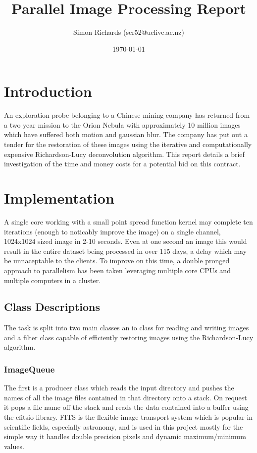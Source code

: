 \documentclass{article}
\title{Parallel Image Processing Report}
\date{\today}
\author{Simon Richards (scr52@uclive.ac.nz)}
\begin{document}
\maketitle
\section{Introduction}
An exploration probe belonging to a Chinese mining company has returned from a
two year mission to the Orion Nebula with  approximately 10 million images which
have suffered both motion and gaussian blur. The company has put out a tender
for the restoration of these images using the iterative and computationally
expensive Richardson-Lucy deconvolution algorithm. This report details a brief
investigation of the time and money costs for a potential bid on this contract.

\section{Implementation}
A single core working with a small point spread function kernel may complete ten
iterations (enough to noticably improve the image) on a single channel,
1024x1024 sized image in 2-10 seconds. Even at one second an image this would
result in the entire dataset being processed in over 115 days, a delay which may
be unnaceptable to the clients. To improve on this time, a double pronged
approach to parallelism has been taken leveraging multiple core CPUs and
multiple computers in a cluster.

\subsection{Class Descriptions}
The task is split into two main classes an io class for reading and writing
images and a filter class capable of efficiently restoring images using the
Richardson-Lucy algorithm.

\subsubsection{ImageQueue}
The first is a producer class which
reads the input directory and pushes the names of all the image files contained in that
directory onto a stack. On request it pops a file name off the stack and reads the
data contained into a buffer using the cfitsio library. FITS is the flexible
image transport system which is popular in scientific fields, especially
astronomy, and is used in this project mostly for the simple way it handles
double precision pixels and dynamic maximum/minimum values.
\end{document}
